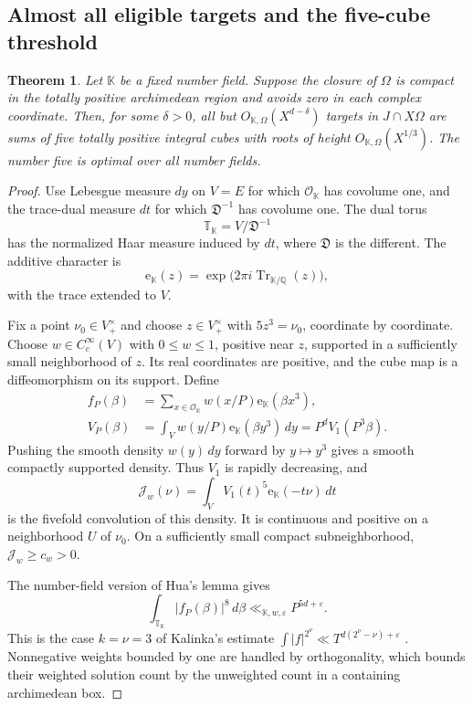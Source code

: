 \documentclass[11pt,letterpaper]{article}
\newtheorem{theorem}{Theorem}[section]
\theoremstyle{definition}
\numberwithin{equation}{section}
\begin{document}
\subsection{Almost all eligible targets and the five-cube threshold}
\begin{theorem}\label{nf3:five}
Let $\mathbb K$ be a fixed number field. Suppose the closure of $\Omega$ is compact in the totally positive archimedean region and avoids zero in each complex coordinate. Then, for some $\delta>0$, all but $O_{\mathbb K,\Omega}(X^{d-\delta})$ targets in $J\cap X\Omega$ are sums of five totally positive integral cubes with roots of height $O_{\mathbb K,\Omega}(X^{1/3})$. The number five is optimal over all number fields.
\end{theorem}
\begin{proof}
Use Lebesgue measure $dy$ on $V=E$ for which $\mathcal O_{\mathbb K}$ has covolume one, and the trace-dual measure $dt$ for which $\mathfrak D^{-1}$ has covolume one. The dual torus
\[
 \mathbb T_{\mathbb K}=V/\mathfrak D^{-1}
\]
has the normalized Haar measure induced by $dt$, where $\mathfrak D$ is the different. The additive character is
\[
 \mathrm e_{\mathbb K}(z)=\exp\bigl(2\pi i\operatorname{Tr}_{\mathbb K/\mathbb Q}(z)\bigr),
\]
with the trace extended to $V$.


Fix a point $\nu_0\in V_+^\times$ and choose $z\in V_+^\times$ with $5z^3=\nu_0$, coordinate by coordinate. Choose $w\in C_c^\infty(V)$ with $0\le w\le1$, positive near $z$, supported in a sufficiently small neighborhood of $z$. Its real coordinates are positive, and the cube map is a diffeomorphism on its support. Define
\begin{align}
 f_P(\beta)&=\sum_{x\in\mathcal O_{\mathbb K}}w(x/P)\mathrm e_{\mathbb K}(\beta x^3),\label{nf3:eq:f}\\
 V_P(\beta)&=\int_V w(y/P)\mathrm e_{\mathbb K}(\beta y^3)\,dy
 =P^d V_1(P^3\beta).\label{nf3:eq:V}
\end{align}
Pushing the smooth density $w(y)\,dy$ forward by $y\mapsto y^3$ gives a smooth compactly supported density. Thus $V_1$ is rapidly decreasing, and
\begin{equation}\label{nf3:eq:singint}
 \mathcal J_w(\nu)=\int_V V_1(t)^5\mathrm e_{\mathbb K}(-t\nu)\,dt
\end{equation}
is the fivefold convolution of this density. It is continuous and positive on a neighborhood $U$ of $\nu_0$. On a sufficiently small compact subneighborhood, $\mathcal J_w\ge c_w>0$.


The number-field version of Hua's lemma gives
\begin{equation}\label{nf3:eq:hua}
 \int_{\mathbb T_{\mathbb K}}|f_P(\beta)|^8\,d\beta
 \ll_{\mathbb K,w,\varepsilon}P^{5d+\varepsilon}.
\end{equation}
This is the case $k=\nu=3$ of Kalinka's estimate
$\int|f|^{2^\nu}\ll T^{d(2^\nu-\nu)+\varepsilon}$
\cite[Lemma 1, p.~151]{nf3:kalinka}. Nonnegative weights bounded by one are handled by orthogonality, which bounds their weighted solution count by the unweighted count in a containing archimedean box.


\end{proof}
\end{document}
